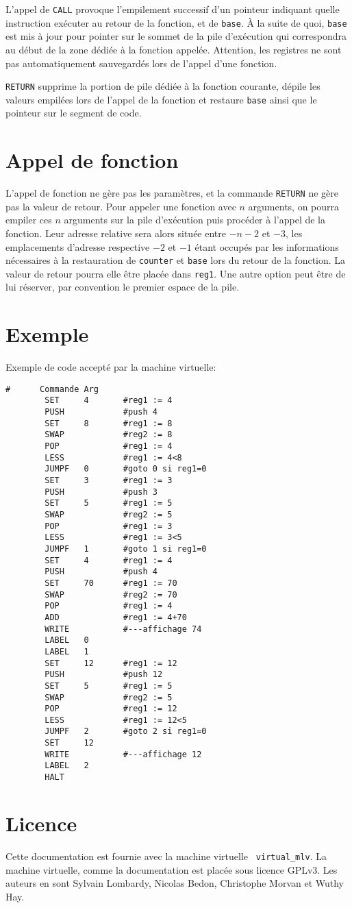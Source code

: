 \documentclass[12pt,a4]{article}
\begin{document}
L'appel de {\tt CALL} provoque l'empilement successif d'un pointeur
indiquant quelle instruction exécuter au
retour de la fonction, et de {\tt base}. À la suite de quoi,
{\tt base} est mis à jour pour pointer sur le sommet de la pile
d'exécution
qui correspondra au début de la zone dédiée à la fonction appelée.
Attention, les registres ne sont pas automatiquement sauvegardés lors
de l'appel d'une fonction.

{\tt RETURN} supprime la portion de pile dédiée à la fonction
courante, dépile les valeurs empilées lors de l'appel de la fonction
et restaure {\tt base} ainsi que le pointeur sur le segment de code.

\section{Appel de fonction}
L'appel de fonction ne gère pas les paramètres, et la commande
{\tt RETURN} ne gère pas la valeur de retour.  Pour appeler une
fonction avec $n$ arguments, on pourra empiler ces $n$ arguments sur
la pile d'exécution puis procéder à l'appel de la fonction. Leur
adresse relative sera alors située entre $-n-2$ et $-3$, les
emplacements d'adresse respective $-2$ et $-1$ étant occupés par les
informations nécessaires à la restauration de {\tt counter} et
{\tt base} lors du retour de la fonction.  La valeur de retour pourra
elle être placée dans {\tt reg1}. Une autre option peut être de lui
réserver, par convention le premier espace de la pile.

\section{Exemple}
Exemple de code accepté par la machine virtuelle:
\begin{verbatim}
#      Commande Arg
        SET     4       #reg1 := 4
        PUSH            #push 4
        SET     8       #reg1 := 8
        SWAP            #reg2 := 8
        POP             #reg1 := 4
        LESS            #reg1 := 4<8
        JUMPF   0       #goto 0 si reg1=0
        SET     3       #reg1 := 3
        PUSH            #push 3
        SET     5       #reg1 := 5
        SWAP            #reg2 := 5
        POP             #reg1 := 3
        LESS            #reg1 := 3<5
        JUMPF   1       #goto 1 si reg1=0
        SET     4       #reg1 := 4
        PUSH            #push 4
        SET     70      #reg1 := 70
        SWAP            #reg2 := 70
        POP             #reg1 := 4
        ADD             #reg1 := 4+70
        WRITE           #---affichage 74
        LABEL   0
        LABEL   1
        SET     12      #reg1 := 12
        PUSH            #push 12
        SET     5       #reg1 := 5
        SWAP            #reg2 := 5
        POP             #reg1 := 12 
        LESS            #reg1 := 12<5
        JUMPF   2       #goto 2 si reg1=0
        SET     12
        WRITE           #---affichage 12
        LABEL   2
        HALT
\end{verbatim}

\section{Licence}

Cette documentation est fournie avec la machine virtuelle {\tt
  virtual\_mlv}. La machine virtuelle, comme la documentation est
placée sous licence GPLv3. Les auteurs en sont Sylvain Lombardy,
Nicolas Bedon, Christophe Morvan et Wuthy Hay.
\end{document}
